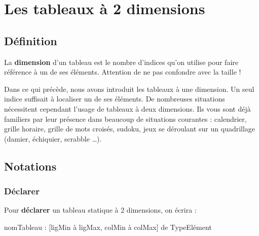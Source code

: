 \chapter{Les tableaux à 2 dimensions}

\section{Définition}

	La \textbf{dimension} d’un tableau est le nombre d’indices qu’on utilise
	pour faire référence à un de ses éléments. Attention de ne pas confondre 
	avec la	taille !
	
	Dans ce qui précède, nous avons introduit les tableaux à une dimension.
	Un seul indice suffisait à localiser un de ses éléments. De nombreuses
	situations nécessitent cependant l’usage de tableaux à deux dimensions.
	Ils vous sont déjà familiers par leur présence dans beaucoup de
	situations courantes : calendrier, grille horaire, grille de mots
	croisés, sudoku, jeux se déroulant sur un quadrillage (damier,
	échiquier, scrabble \dots).

\section{Notations}

\subsection{Déclarer}
	
	Pour \textbf{déclarer} un tableau statique à 2 dimensions, on écrira :

	\begin{Pseudocode}
	\Decl nomTableau :  [ligMin à ligMax, colMin à colMax] de TypeElément
	\end{Pseudocode}

	

